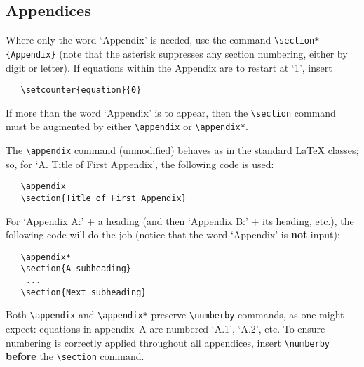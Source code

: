 \subsection{Appendices}

Where only the word `Appendix' is needed, use the command
\verb|\section*{Appendix}| (note that the asterisk suppresses any
section numbering, either by digit or letter). If equations within the
Appendix are to restart at `1', insert

\begin{verbatim}
   \setcounter{equation}{0}
\end{verbatim}

If more than the word `Appendix' is to appear, then the
\verb|\section| command must be augmented by either \verb|\appendix|
or \verb|\appendix*|.

The \verb|\appendix| command (unmodified) behaves as in the standard
\LaTeX{} classes; so, for `A. Title of First Appendix', the following
code is used:
%
\begin{verbatim}
   \appendix
   \section{Title of First Appendix}
\end{verbatim}

For `Appendix A:' + a heading (and then `Appendix B:' + its heading,
etc.), the following code will do the job (notice that the word
`Appendix' is \textbf{not} input):

\begin{verbatim}
   \appendix*
   \section{A subheading}
    ...
   \section{Next subheading}
\end{verbatim}

Both \verb|\appendix| and \verb|\appendix*| preserve \verb|\numberby|
commands, as one might expect: equations in appendix~A are numbered
`A.1', `A.2', etc. To ensure numbering is correctly applied throughout
all appendices, insert \verb|\numberby| {\bf before} the
\verb|\section| command.


